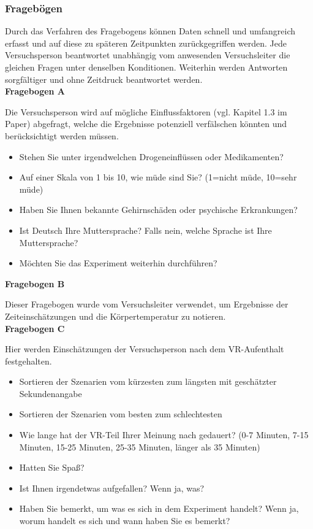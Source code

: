 \documentclass{Bericht}
\begin{document}
\subsubsection{Fragebögen}
Durch das Verfahren des Fragebogens können Daten schnell und umfangreich erfasst und auf diese zu späteren Zeitpunkten zurückgegriffen werden. Jede Versuchsperson beantwortet unabhängig vom anwesenden Versuchsleiter die gleichen Fragen unter denselben Konditionen. Weiterhin werden Antworten sorgfältiger und ohne Zeitdruck beantwortet werden.\\
\newpage
\label{subsec:fragebogen}
\textbf{Fragebogen A}

Die Versuchsperson wird auf mögliche Einflussfaktoren (vgl. Kapitel 1.3 im Paper) abgefragt, welche die Ergebnisse potenziell verfälschen könnten und berücksichtigt werden müssen.
\begin{itemize}
	\setlength{\itemsep}{0em}
	\item Stehen Sie unter irgendwelchen Drogeneinflüssen oder Medikamenten?
	\item Auf einer Skala von 1 bis 10, wie müde sind Sie? (1=nicht müde, 10=sehr müde)
	\item Haben Sie Ihnen bekannte Gehirnschäden oder psychische Erkrankungen?
	\item Ist Deutsch Ihre Muttersprache? Falls nein, welche Sprache ist Ihre Muttersprache?
	\item Möchten Sie das Experiment weiterhin durchführen?
\end{itemize}

\textbf{Fragebogen B}

Dieser Fragebogen wurde vom Versuchsleiter verwendet, um Ergebnisse der Zeiteinschätzungen und die Körpertemperatur zu notieren.\\


\textbf{Fragebogen C}

Hier werden Einschätzungen der Versuchsperson nach dem VR-Aufenthalt festgehalten.

\begin{itemize}
	\setlength{\itemsep}{0em}
	\item Sortieren der Szenarien vom kürzesten zum längsten mit geschätzter Sekundenangabe
	\item Sortieren der Szenarien vom besten zum schlechtesten
	\item Wie lange hat der VR-Teil Ihrer Meinung nach gedauert? (0-7 Minuten, 7-15 Minuten, 15-25 Minuten, 25-35 Minuten, länger als 35 Minuten)
	\item Hatten Sie Spaß?
	\item Ist Ihnen irgendetwas aufgefallen? Wenn ja, was?
	\item Haben Sie bemerkt, um was es sich in dem Experiment handelt? Wenn ja, worum handelt es sich und wann haben Sie es bemerkt?
\end{itemize}
\end{document}
